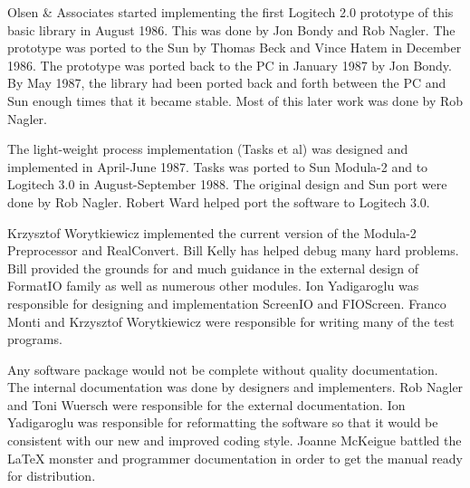 Olsen \& Associates started implementing the first Logitech 2.0 prototype
of this basic library in August 1986.  This was done by Jon Bondy and 
Rob Nagler.  The prototype was ported to the Sun by Thomas Beck and
Vince Hatem in December 1986.  The prototype was ported back to the PC
in January 1987 by Jon Bondy.  By May 1987, the library had been ported
back and forth between the PC and Sun enough times that it became stable.
Most of this later work was done by Rob Nagler.

The light-weight process implementation (Tasks et al) was designed and
implemented in April-June 1987.  Tasks was ported to Sun Modula-2 and to
Logitech 3.0 in August-September 1988.  The original design and Sun port
were done by Rob Nagler.  Robert Ward helped port the software to
Logitech 3.0.

Krzysztof Worytkiewicz implemented the current version of the Modula-2
Preprocessor and RealConvert.  Bill Kelly has helped debug many hard
problems.  Bill provided the grounds for and much guidance in the external
design of FormatIO family as well as numerous other modules.  Ion Yadigaroglu
was responsible for designing and implementation ScreenIO and FIOScreen.
Franco Monti and Krzysztof Worytkiewicz were responsible for writing 
many of the test programs.

Any software package would not be complete without quality documentation.
The internal documentation was done by designers and implementers.
Rob Nagler and Toni Wuersch were responsible for the external documentation.
Ion Yadigaroglu was responsible for reformatting the software so that it
would be consistent with our new and improved coding style.  Joanne McKeigue 
battled the LaTeX monster and programmer documentation in order to get the
manual ready for distribution.
\newpage
